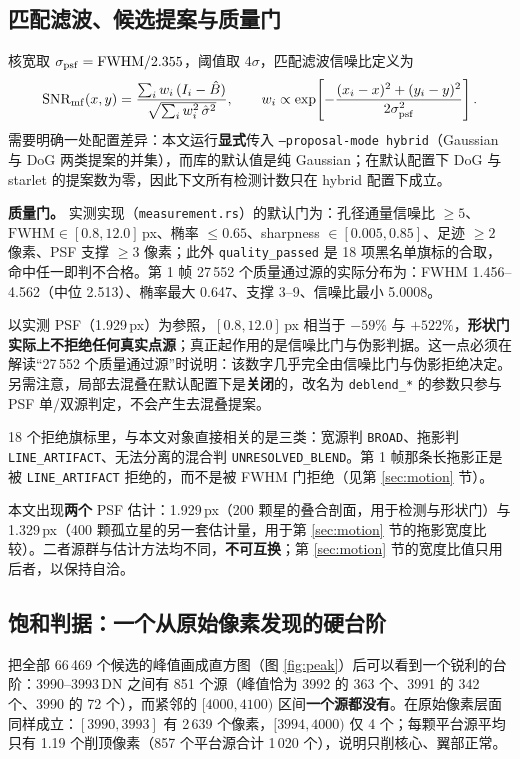 \documentclass[11pt,a4paper]{ctexart}
\begin{document}
\subsection{匹配滤波、候选提案与质量门}
核宽取 $\sigma_{\rm psf}=\mathrm{FWHM}/2.355$，阈值取 $4\sigma$，匹配滤波信噪比定义为
\begin{equation}
\mathrm{SNR}_{\rm mf}(x,y)=\frac{\sum_i w_i\,(I_i-\hat B)}{\sqrt{\sum_i w_i^2\,\hat\sigma^2}},\qquad
w_i\propto\exp\!\left[-\frac{(x_i-x)^2+(y_i-y)^2}{2\sigma_{\rm psf}^2}\right].
\end{equation}
需要明确一处配置差异：本文运行\textbf{显式}传入 \texttt{--proposal-mode hybrid}（Gaussian 与 DoG 两类提案的并集），而库的默认值是纯 Gaussian；在默认配置下 DoG 与 starlet 的提案数为零，因此下文所有检测计数只在 hybrid 配置下成立。

\noindent\textbf{质量门。} 实测实现（\texttt{measurement.rs}）的默认门为：孔径通量信噪比 $\ge5$、$\mathrm{FWHM}\in[0.8,12.0]$\,px、椭率 $\le0.65$、sharpness $\in[0.005,0.85]$、足迹 $\ge2$ 像素、PSF 支撑 $\ge3$ 像素；此外 \texttt{quality\_passed} 是 18 项黑名单旗标的合取，命中任一即判不合格。第 1 帧 27\,552 个质量通过源的实际分布为：FWHM 1.456--4.562（中位 2.513）、椭率最大 0.647、支撑 3--9、信噪比最小 5.0008。

以实测 PSF（1.929\,px）为参照，$[0.8,12.0]$\,px 相当于 $-59\%$ 与 $+522\%$，\textbf{形状门实际上不拒绝任何真实点源}；真正起作用的是信噪比门与伪影判据。这一点必须在解读“27\,552 个质量通过源”时说明：该数字几乎完全由信噪比门与伪影拒绝决定。另需注意，局部去混叠在默认配置下是\textbf{关闭}的，改名为 \texttt{deblend\_*} 的参数只参与 PSF 单/双源判定，不会产生去混叠提案。

18 个拒绝旗标里，与本文对象直接相关的是三类：宽源判 \texttt{BROAD}、拖影判 \texttt{LINE\_ARTIFACT}、无法分离的混合判 \texttt{UNRESOLVED\_BLEND}。第 1 帧那条长拖影正是被 \texttt{LINE\_ARTIFACT} 拒绝的，而不是被 FWHM 门拒绝（见第 \ref{sec:motion} 节）。

本文出现\textbf{两个} PSF 估计：1.929\,px（200 颗星的叠合剖面，用于检测与形状门）与 1.329\,px（400 颗孤立星的另一套估计量，用于第 \ref{sec:motion} 节的拖影宽度比较）。二者源群与估计方法均不同，\textbf{不可互换}；第 \ref{sec:motion} 节的宽度比值只用后者，以保持自洽。

\subsection{饱和判据：一个从原始像素发现的硬台阶}\label{sec:sat}
把全部 66\,469 个候选的峰值画成直方图（图 \ref{fig:peak}）后可以看到一个锐利的台阶：3990--3993\,DN 之间有 851 个源（峰值恰为 3992 的 363 个、3991 的 342 个、3990 的 72 个），而紧邻的 $[4000,4100)$ 区间\textbf{一个源都没有}。在原始像素层面同样成立：$[3990,3993]$ 有 2\,639 个像素，$[3994,4000)$ 仅 4 个；每颗平台源平均只有 1.19 个削顶像素（857 个平台源合计 1\,020 个），说明只削核心、翼部正常。
\end{document}
